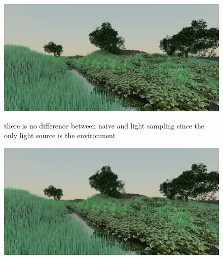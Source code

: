 \documentclass[12pt]{report}
\begin{document}
    \begin{figure}[h]
        \caption{there is no difference between naive and light sampling since the only light source is the environment}
        \includegraphics[width=\textwidth]{ecosys_naive}
        \centering
        \label{fig:ecosys_naive}
    \end{figure}
    \begin{figure}[h]
        \includegraphics[width=\textwidth]{ecosys_path}
        \centering
        \label{fig:ecosys_path}
    \end{figure}
\end{document}
